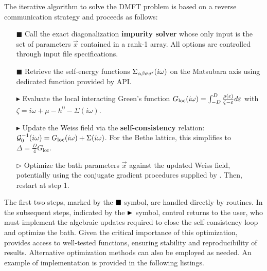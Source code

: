 \documentclass[edipack2.tex]{subfiles}
\begin{document}
The iterative algorithm to solve the DMFT problem is based on
a reverse communication strategy and proceeds as follows:
\begin{itemize}
  
\item[{\tiny $\blacksquare$}] Call the exact diagonalization {\bf impurity solver}
  whose only input is the set of parameters $\vec{x}$ contained in a
  rank-1 array. All  \NAME options are controlled through input file
  specifications.
  
\item[{\tiny $\blacksquare$}] Retrieve the self-energy functions $\Sigma_{\alpha\beta\sigma\sigma'}(i\omega)$ on the
  Matsubara axis using dedicated function provided by \NAME API.
  
\item[{\tiny $\blacktriangleright$}] Evaluate the local interacting Green's function
  $G_\mathrm{loc}(i\omega) = \int_{-D}^D \frac{\rho(\varepsilon)}{\zeta -\varepsilon}d\varepsilon$ with
  $\zeta=i\omega+\mu-h^0-\Sigma(i\omega)$.
  
\item[{\tiny $\blacktriangleright$}] Update the Weiss field via the {\bf self-consistency}
  relation: ${\cal G}^{-1}_0(i\omega) = G_\mathrm{loc}(i\omega) +
    \Sigma(i\omega)$. For the Bethe lattice, this simplifies to
    $\Delta = \tfrac{D}{4}G_\mathrm{loc}$.
    
  \item[{\tiny $\triangleright$}] Optimize the bath parameters $\vec{x}$ against the updated
    Weiss field,  potentially using the conjugate gradient procedures 
supplied by \NAME. Then, restart at step 1.
\end{itemize}

The first two steps, marked by the ${\tiny \blacksquare}$ symbol, 
are handled directly by \NAME routines. In the subsequent steps, 
indicated by the ${\tiny \blacktriangleright}$ symbol, control returns 
to the user, who must implement the algebraic updates required to 
close the self-consistency loop and optimize the bath.
Given the 
critical importance of this optimization, \NAME provides access to 
well-tested functions, ensuring stability and reproducibility of 
results. Alternative optimization methods can also be employed as 
needed. 
An example of implementation is provided in the following listings.
\end{document}
